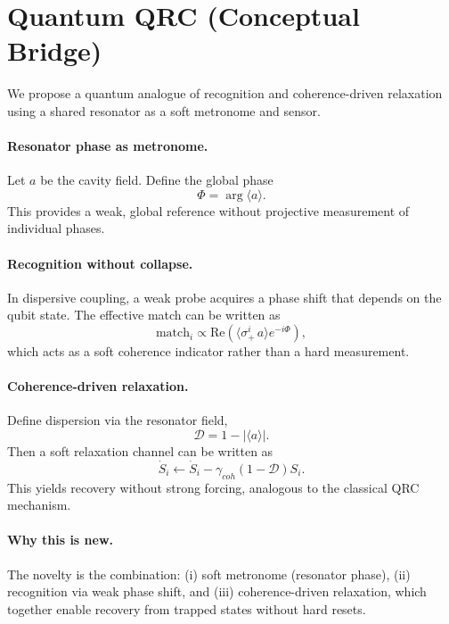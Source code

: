 ﻿\documentclass[12pt,a4paper]{article}
\begin{document}
\section{Quantum QRC (Conceptual Bridge)}
We propose a quantum analogue of recognition and coherence-driven relaxation using a shared resonator as a soft metronome and sensor.

\paragraph{Resonator phase as metronome.}
Let $a$ be the cavity field. Define the global phase
\begin{equation}
\Phi = \arg\langle a\rangle.
\end{equation}
This provides a weak, global reference without projective measurement of individual phases.

\paragraph{Recognition without collapse.}
In dispersive coupling, a weak probe acquires a phase shift that depends on the qubit state. The effective match can be written as
\begin{equation}
\mathrm{match}_i \propto \mathrm{Re}\left(\langle \sigma_+^i\, a\rangle e^{-i\Phi}\right),
\end{equation}
which acts as a soft coherence indicator rather than a hard measurement.

\paragraph{Coherence-driven relaxation.}
Define dispersion via the resonator field,
\begin{equation}
\mathcal{D}=1-\left|\langle a\rangle\right|.
\end{equation}
Then a soft relaxation channel can be written as
\begin{equation}
\dot S_i \leftarrow \dot S_i - \gamma_{coh}(1-\mathcal{D})S_i.
\end{equation}
This yields recovery without strong forcing, analogous to the classical QRC mechanism.

\paragraph{Why this is new.}
The novelty is the combination: (i) soft metronome (resonator phase), (ii) recognition via weak phase shift, and (iii) coherence-driven relaxation, which together enable recovery from trapped states without hard resets.
\end{document}
